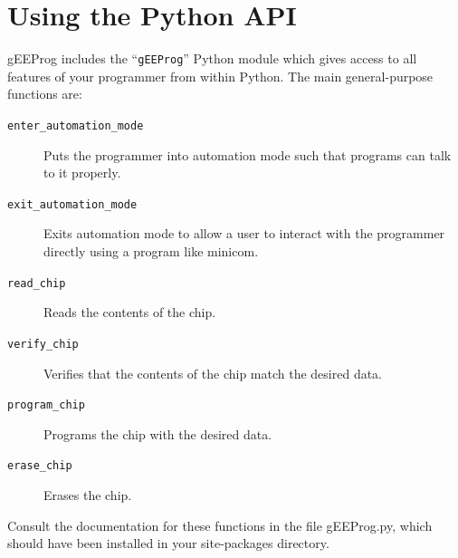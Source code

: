 \documentclass[letter]{article}
\begin{document}
\section{Using the Python API}
gEEProg includes the ``\texttt{gEEProg}'' Python module which gives access to all features of your programmer from within Python.
The main general-purpose functions are:
\begin{description}
	\item[\texttt{enter\_automation\_mode}] Puts the programmer into automation mode such that programs can talk to it properly.
	\item[\texttt{exit\_automation\_mode}] Exits automation mode to allow a user to interact with the programmer directly using a program like minicom.
	\item[\texttt{read\_chip}] Reads the contents of the chip.
	\item[\texttt{verify\_chip}] Verifies that the contents of the chip match the desired data.
	\item[\texttt{program\_chip}] Programs the chip with the desired data.
	\item[\texttt{erase\_chip}] Erases the chip.
\end{description}
Consult the documentation for these functions in the file gEEProg.py, which should have been installed in your site-packages directory.
\end{document}
